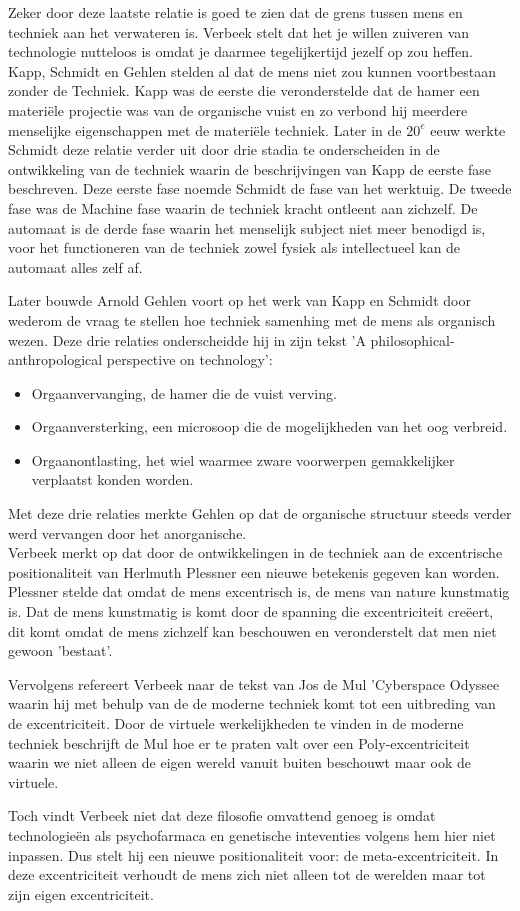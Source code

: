 \documentclass[pdftex,12pt,a4paper]{article}
\begin{document}
Zeker door deze laatste relatie is goed te zien dat de grens tussen mens en techniek aan het verwateren is. Verbeek stelt dat het je willen zuiveren van technologie nutteloos is omdat je daarmee tegelijkertijd jezelf op zou heffen. Kapp, Schmidt en Gehlen stelden al dat de mens niet zou kunnen voortbestaan zonder de Techniek. Kapp was de eerste die veronderstelde dat de hamer een materiële projectie was van de organische vuist en zo verbond hij meerdere menselijke eigenschappen met de materiële techniek. Later in de $20^{e}$ eeuw werkte Schmidt deze relatie verder uit door drie stadia te onderscheiden in de ontwikkeling van de techniek waarin de beschrijvingen van Kapp de eerste fase beschreven. Deze eerste fase noemde Schmidt de fase van het werktuig. De tweede fase was de Machine fase waarin de techniek kracht ontleent aan zichzelf. De automaat is de derde fase waarin het menselijk subject niet meer benodigd is, voor het functioneren van de techniek zowel fysiek als intellectueel kan de automaat alles zelf af.

Later bouwde Arnold Gehlen voort op het werk van Kapp en Schmidt door wederom de vraag te stellen hoe techniek samenhing met de mens als organisch wezen. Deze drie relaties onderscheidde hij in zijn tekst 'A philosophical-anthropological perspective on technology':
\begin{itemize}
\item Orgaanvervanging, de hamer die de vuist verving.
\item Orgaanversterking, een microsoop die de mogelijkheden van het oog verbreid.
\item Orgaanontlasting, het wiel waarmee zware voorwerpen gemakkelijker verplaatst konden worden.
\end{itemize}
Met deze drie relaties merkte Gehlen op dat de organische structuur steeds verder werd vervangen door het anorganische.\\

Verbeek merkt op dat door de ontwikkelingen in de techniek aan de excentrische positionaliteit van Herlmuth Plessner een nieuwe betekenis gegeven kan worden. Plessner stelde dat omdat de mens excentrisch is, de mens van nature kunstmatig is. Dat de mens kunstmatig is komt door de spanning die excentriciteit creëert, dit komt omdat de mens zichzelf kan beschouwen en veronderstelt dat men niet gewoon 'bestaat'.

Vervolgens refereert Verbeek naar de tekst van Jos de Mul 'Cyberspace Odyssee waarin hij met behulp van de de moderne techniek komt tot een uitbreding van de excentriciteit. Door de virtuele werkelijkheden te vinden in de moderne techniek beschrijft de Mul hoe er te praten valt over een Poly-excentriciteit waarin we niet alleen de eigen wereld vanuit buiten beschouwt maar ook de virtuele.

Toch vindt Verbeek niet dat deze filosofie omvattend genoeg is omdat technologieën als psychofarmaca en genetische inteventies volgens hem hier niet inpassen. Dus stelt hij een nieuwe positionaliteit voor: de meta-excentriciteit. In deze excentriciteit verhoudt de mens zich niet alleen tot de werelden maar tot zijn eigen excentriciteit.
\end{document}
